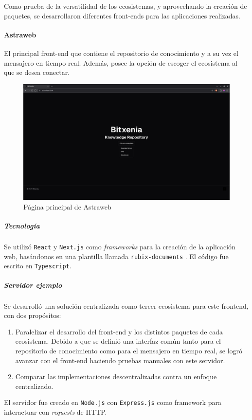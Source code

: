 
Como prueba de la versatilidad de los ecosistemas, y aprovechando la creación de paquetes, se desarrollaron diferentes front-ends para las aplicaciones realizadas.

\paragraph{Astraweb}

El principal front-end que contiene el repositorio de conocimiento y a su vez el mensajero en tiempo real. Además, posee la opción de escoger el ecosistema al que se desea conectar.

\begin{figure}[H]
    \centering
    \includegraphics[width=1\linewidth]{img/astraweb-main-page.png}
    \caption{Página principal de Astraweb}
    \label{fig:astraweb-main-page}
\end{figure}

\subparagraph{Tecnología} Se utilizó \texttt{React} \cite{react} y \texttt{Next.js} \cite{next} como \textit{frameworks} para la creación de la aplicación web, basándonos en una plantilla llamada \texttt{rubix-documents} \cite{rubix}. El código fue escrito en \texttt{Typescript}.

\subparagraph{Servidor ejemplo} Se desarrolló una solución centralizada como tercer ecosistema para este frontend, con dos propósitos:
\begin{enumerate}
    \item Paralelizar el desarrollo del front-end y los distintos paquetes de cada ecosistema. Debido a que se definió una interfaz común tanto para el repositorio de conocimiento como para el mensajero en tiempo real, se logró avanzar con el front-end haciendo pruebas manuales con este servidor.
    \item Comparar las implementaciones descentralizadas contra un enfoque centralizado.
\end{enumerate}
El servidor fue creado en \texttt{Node.js} con \texttt{Express.js} como framework para interactuar con \textit{requests} de HTTP.

